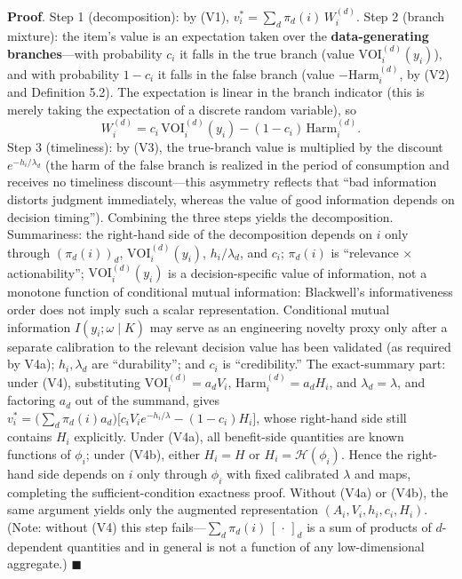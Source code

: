 \documentclass[
  11pt]{article}
\begin{document}
\textbf{Proof}. Step 1 (decomposition): by (V1),
\(v_i^* = \sum_d \pi_d(i)\,W_i^{(d)}\). Step 2 (branch mixture): the
item's value is an expectation taken over the \textbf{data-generating
branches}---with probability \(c_i\) it falls in the true branch (value
\(\mathrm{VOI}_i^{(d)}(y_i)\)), and with probability \(1-c_i\) it falls
in the false branch (value \(-\mathrm{Harm}_i^{(d)}\), by (V2) and
Definition 5.2). The expectation is linear in the branch indicator (this
is merely taking the expectation of a discrete random variable), so
\[W_i^{(d)} = c_i\,\mathrm{VOI}_i^{(d)}(y_i) - (1-c_i)\,\mathrm{Harm}_i^{(d)}.\]
Step 3 (timeliness): by (V3), the true-branch value is multiplied by the
discount \(e^{-h_i/\lambda_d}\) (the harm of the false branch is
realized in the period of consumption and receives no timeliness
discount---this asymmetry reflects that ``bad information distorts
judgment immediately, whereas the value of good information depends on
decision timing''). Combining the three steps yields the decomposition.
Summariness: the right-hand side of the decomposition depends on \(i\)
only through \((\pi_d(i))_{d}\), \(\mathrm{VOI}_i^{(d)}(y_i)\),
\(h_i/\lambda_d\), and \(c_i\); \(\pi_d(i)\) is ``relevance ×
actionability''; \(\mathrm{VOI}_i^{(d)}(y_i)\) is a decision-specific
value of information, not a monotone function of conditional mutual
information: Blackwell's informativeness order does not imply such a
scalar representation. Conditional mutual information
\(I(y_i;\omega\mid K)\) may serve as an engineering novelty proxy only
after a separate calibration to the relevant decision value has been
validated (as required by V4a); \(h_i, \lambda_d\) are ``durability'';
and \(c_i\) is ``credibility.'' The exact-summary part: under (V4),
substituting \(\mathrm{VOI}_i^{(d)} = a_dV_i\),
\(\mathrm{Harm}_i^{(d)} = a_dH_i\), and \(\lambda_d = \lambda\), and
factoring \(a_d\) out of the summand, gives
\(v_i^* = \big(\sum_d \pi_d(i)a_d\big)\big[c_iV_ie^{-h_i/\lambda} - (1-c_i)H_i\big]\),
whose right-hand side still contains \(H_i\) explicitly. Under (V4a),
all benefit-side quantities are known functions of \(\phi_i\); under
(V4b), either \(H_i=H\) or \(H_i=\mathcal H(\phi_i)\). Hence the
right-hand side depends on \(i\) only through \(\phi_i\) with fixed
calibrated \(\lambda\) and maps, completing the sufficient-condition
exactness proof. Without (V4a) or (V4b), the same argument yields only
the augmented representation \((A_i,V_i,h_i,c_i,H_i)\). (Note: without
(V4) this step fails---\(\sum_d \pi_d(i)\,[\,\cdot\,]_d\) is a sum of
products of \(d\)-dependent quantities and in general is not a function
of any low-dimensional aggregate.) \(\blacksquare\)
\end{document}
